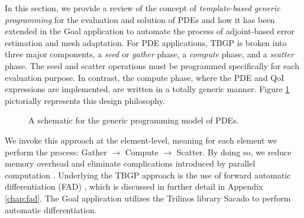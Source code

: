 In this section, we provide a review of the concept of
\emph{template-based generic programming} for the evaluation and solution of
PDEs \cite{pawlowski2012automating1,pawlowski2012automating2} and how it
has been extended in the Goal application to automate the process of
adjoint-based error estimation and mesh adaptation. 
For PDE applications, TBGP is broken into three major components,
a \emph{seed} or \emph{gather} phase, a \emph{compute} phase, and
a \emph{scatter} phase. The seed and scatter operations must be
programmed specifically for each evaluation purpose. In contrast, the
compute phase, where the PDE and QoI expressions are implemented,
are written in a totally generic manner. Figure \ref{fig:mech_tbgp}
pictorially represents this design philosophy.

\begin{figure}[ht!]
\centering

\caption{A schematic for the generic programming model of PDEs.}
\label{fig:mech_tbgp}
\end{figure}

We invoke this approach at the element-level, meaning for each element
we perform the process: Gather $\rightarrow$ Compute $\rightarrow$
Scatter. By doing so, we reduce memory overhead and eliminate complications
introduced by parallel computation \cite{pawlowski2012automating2}.
Underlying the TBGP approach is the use of forward automatic differentiation
(FAD) \cite{griewank2008evaluating}, which is discussed in further detail
in Appendix \ref{chap:fad}. The Goal application utilizes the
Trilinos library Sacado \cite{phipps2012efficient} to perform
automatic differentiation.

